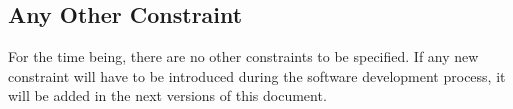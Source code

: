 \subsection{Any Other Constraint}

For the time being, there are no other constraints to be specified. If any new constraint will have to be introduced during the software development process, it will be added in the next versions of this document.

 
 